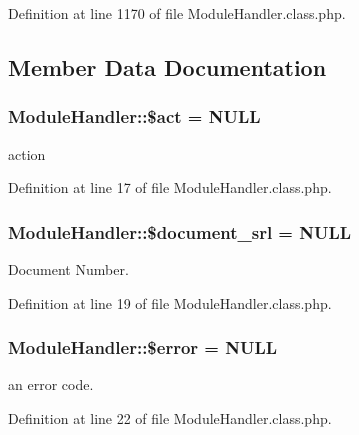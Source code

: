 Definition at line 1170 of file Module\+Handler.\+class.\+php.



\subsection{Member Data Documentation}
\hypertarget{classModuleHandler_ae332c92a6ad1e9e823281d708088a0ff}{}
\subsubsection[{\$act}]{\setlength{\rightskip}{0pt plus 5cm}Module\+Handler\+::\$act = N\+U\+L\+L}\label{classModuleHandler_ae332c92a6ad1e9e823281d708088a0ff}


action 



Definition at line 17 of file Module\+Handler.\+class.\+php.

\hypertarget{classModuleHandler_acf9f6062042025aab6a7e10f6b261909}{}
\subsubsection[{\$document\+\_\+srl}]{\setlength{\rightskip}{0pt plus 5cm}Module\+Handler\+::\$document\+\_\+srl = N\+U\+L\+L}\label{classModuleHandler_acf9f6062042025aab6a7e10f6b261909}


Document Number. 



Definition at line 19 of file Module\+Handler.\+class.\+php.

\hypertarget{classModuleHandler_ad81b78f21e42724e73da6808c561159c}{}
\subsubsection[{\$error}]{\setlength{\rightskip}{0pt plus 5cm}Module\+Handler\+::\$error = N\+U\+L\+L}\label{classModuleHandler_ad81b78f21e42724e73da6808c561159c}


an error code. 



Definition at line 22 of file Module\+Handler.\+class.\+php.


